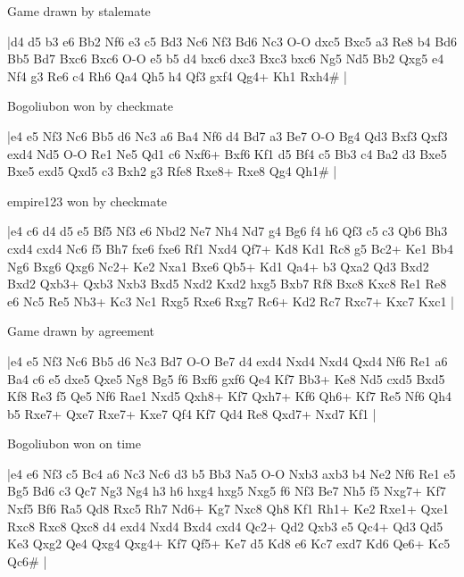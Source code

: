 \showboard

Game drawn by stalemate

\makegametitle
|d4 d5 b3 e6 Bb2 Nf6 e3 c5 Bd3 Nc6 Nf3 Bd6 Nc3 O-O dxc5 Bxc5 a3 Re8 b4 Bd6 Bb5 Bd7 Bxc6 Bxc6 O-O e5 b5 d4 bxc6 dxc3 Bxc3 bxc6 Ng5 Nd5 Bb2 Qxg5 e4 Nf4 g3 Re6 c4 Rh6 Qa4 Qh5 h4 Qf3 gxf4 Qg4+ Kh1 Rxh4\#  |

\showboard

Bogoliubon won by checkmate

\makegametitle
|e4 e5 Nf3 Nc6 Bb5 d6 Nc3 a6 Ba4 Nf6 d4 Bd7 a3 Be7 O-O Bg4 Qd3 Bxf3 Qxf3 exd4 Nd5 O-O Re1 Ne5 Qd1 c6 Nxf6+ Bxf6 Kf1 d5 Bf4 c5 Bb3 c4 Ba2 d3 Bxe5 Bxe5 exd5 Qxd5 c3 Bxh2 g3 Rfe8 Rxe8+ Rxe8 Qg4 Qh1\#  |

\showboard

empire123 won by checkmate

\makegametitle
|e4 c6 d4 d5 e5 Bf5 Nf3 e6 Nbd2 Ne7 Nh4 Nd7 g4 Bg6 f4 h6 Qf3 c5 c3 Qb6 Bh3 cxd4 cxd4 Nc6 f5 Bh7 fxe6 fxe6 Rf1 Nxd4 Qf7+ Kd8 Kd1 Rc8 g5 Bc2+ Ke1 Bb4 Ng6 Bxg6 Qxg6 Nc2+ Ke2 Nxa1 Bxe6 Qb5+ Kd1 Qa4+ b3 Qxa2 Qd3 Bxd2 Bxd2 Qxb3+ Qxb3 Nxb3 Bxd5 Nxd2 Kxd2 hxg5 Bxb7 Rf8 Bxc8 Kxc8 Re1 Re8 e6 Nc5 Re5 Nb3+ Kc3 Nc1 Rxg5 Rxe6 Rxg7 Rc6+ Kd2 Rc7 Rxc7+ Kxc7 Kxc1  |

\showboard

Game drawn by agreement

\makegametitle
|e4 e5 Nf3 Nc6 Bb5 d6 Nc3 Bd7 O-O Be7 d4 exd4 Nxd4 Nxd4 Qxd4 Nf6 Re1 a6 Ba4 c6 e5 dxe5 Qxe5 Ng8 Bg5 f6 Bxf6 gxf6 Qe4 Kf7 Bb3+ Ke8 Nd5 cxd5 Bxd5 Kf8 Re3 f5 Qe5 Nf6 Rae1 Nxd5 Qxh8+ Kf7 Qxh7+ Kf6 Qh6+ Kf7 Re5 Nf6 Qh4 b5 Rxe7+ Qxe7 Rxe7+ Kxe7 Qf4 Kf7 Qd4 Re8 Qxd7+ Nxd7 Kf1  |

\showboard

Bogoliubon won on time

\makegametitle
|e4 e6 Nf3 c5 Bc4 a6 Nc3 Nc6 d3 b5 Bb3 Na5 O-O Nxb3 axb3 b4 Ne2 Nf6 Re1 e5 Bg5 Bd6 c3 Qc7 Ng3 Ng4 h3 h6 hxg4 hxg5 Nxg5 f6 Nf3 Be7 Nh5 f5 Nxg7+ Kf7 Nxf5 Bf6 Ra5 Qd8 Rxc5 Rh7 Nd6+ Kg7 Nxc8 Qh8 Kf1 Rh1+ Ke2 Rxe1+ Qxe1 Rxc8 Rxc8 Qxc8 d4 exd4 Nxd4 Bxd4 cxd4 Qc2+ Qd2 Qxb3 e5 Qc4+ Qd3 Qd5 Ke3 Qxg2 Qe4 Qxg4 Qxg4+ Kf7 Qf5+ Ke7 d5 Kd8 e6 Kc7 exd7 Kd6 Qe6+ Kc5 Qc6\#  |

